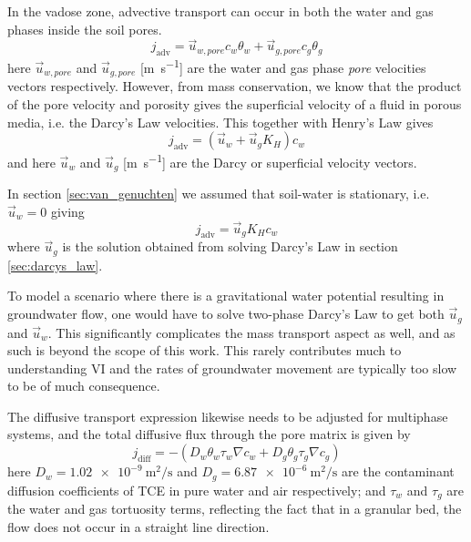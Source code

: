 In the vadose zone, advective transport can occur in both the water and gas phases inside the soil pores.
\begin{equation}
  j_\mathrm{adv} = \vec{u}_{w,pore} c_w \theta_w + \vec{u}_{g,pore} c_g \theta_g
\end{equation}
here $\vec{u}_{w,pore}$ and $\vec{u}_{g,pore}$ [\si{\metre\per\second}] are the water and gas phase \textit{pore} velocities vectors respectively.
However, from mass conservation, we know that the product of the pore velocity and porosity gives the superficial velocity of a fluid in porous media, i.e. the Darcy's Law velocities.
This together with Henry's Law gives
\begin{equation}
  j_\mathrm{adv} = (\vec{u}_w + \vec{u}_g K_H ) c_w
\end{equation}
and here $\vec{u}_w$ and $\vec{u}_g$ [\si{\metre\per\second}] are the Darcy or superficial velocity vectors.\par

In section \ref{sec:van_genuchten} we assumed that soil-water is stationary, i.e. $\vec{u}_w = 0$ giving
\begin{equation}
  j_\mathrm{adv} = \vec{u}_g K_H c_w
\end{equation}
where $\vec{u}_g$ is the solution obtained from solving Darcy's Law in section \ref{sec:darcys_law}.\par

To model a scenario where there is a gravitational water potential resulting in groundwater flow, one would have to solve two-phase Darcy's Law to get both $\vec{u}_g$ and $\vec{u}_w$.
This significantly complicates the mass transport aspect as well, and as such is beyond the scope of this work.
This rarely contributes much to understanding VI and the rates of groundwater movement are typically too slow to be of much consequence.\par

The diffusive transport expression likewise needs to be adjusted for multiphase systems, and the total diffusive flux through the pore matrix is given by
\begin{equation}
  j_\mathrm{diff} = -(D_w \theta_w \tau_w \nabla c_w + D_g \theta_g \tau_g \nabla c_g)
\end{equation}
here $D_w = \SI{1.02e-9}{\metre\squared\per\second}$ and $D_g = \SI{6.87e-6}{\metre\squared\per\second}$ are the contaminant diffusion coefficients of TCE in pure water and air respectively;
and $\tau_w$ and $\tau_g$ are the water and gas tortuosity terms, reflecting the fact that in a granular bed, the flow does not occur in a straight line direction.\par


